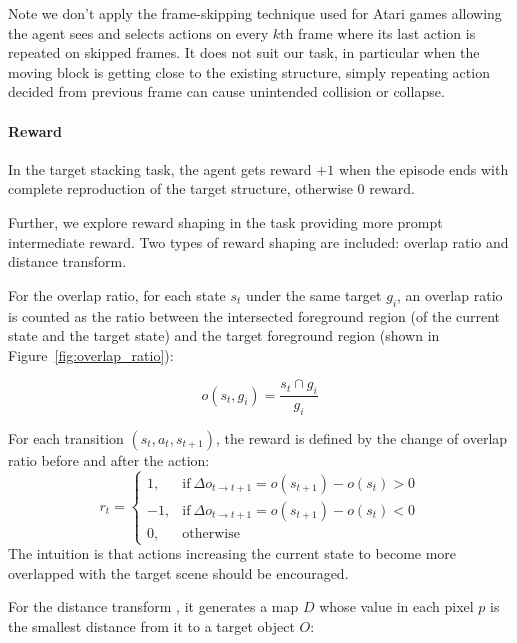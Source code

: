Note we don't apply the frame-skipping technique \citep{bellemare2012investigating} used for Atari games \citep{mnih2015human} allowing the agent sees and selects actions on every $k$th frame where its last action is repeated on skipped frames. It does not suit our task, in particular when the moving block is getting close to the existing structure, simply repeating action decided from previous frame can cause unintended collision or collapse. 

\paragraph{Reward}
In the target stacking task, the agent gets reward $+1$ when the episode ends with complete reproduction of the target structure, otherwise $0$ reward.

Further, we explore reward shaping \citep{ng1999policy} in the task providing more prompt intermediate reward. Two types of reward shaping are included: overlap ratio and distance transform. 

For the overlap ratio, for each state $s_t$ under the same target $g_i$, an overlap ratio is counted as the ratio between the intersected foreground region (of the current state and the target state) and the target foreground region (shown in Figure~\ref{fig:overlap_ratio}):

\begin{equation}\label{eq:ovl}
o(s_t,g_i) = \frac{s_t \cap g_i}{g_i}
\end{equation}

For each transition $(s_t, a_t, s_{t+1})$, the reward is defined by the change of overlap ratio before and after the action: 
\begin{equation}
    r_t =
    \begin{cases}
      1, & \text{if}\ \Delta o_{t\rightarrow t+1} = o(s_{t+1}) - o(s_t) >  0 \\
      -1, & \text{if}\ \Delta o_{t\rightarrow t+1} = o(s_{t+1}) - o(s_t) <  0\\
      0, & \text{otherwise}
    \end{cases}
\end{equation}
The intuition is that actions increasing the current state to become more overlapped with the target scene should be encouraged.

For the distance transform \citep{fabbri20082d}, it generates a map $D$ whose value in each pixel $p$ is the smallest distance from it to a target object $O$:

